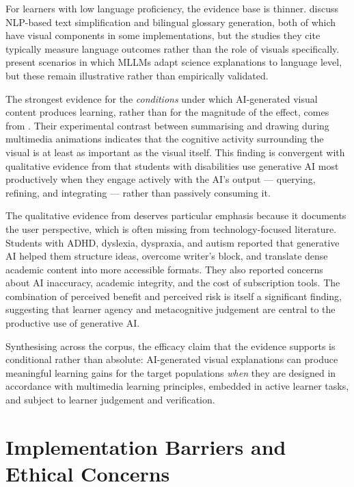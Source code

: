 For learners with low language proficiency, the evidence base is thinner. \citet{ahmad2025} discuss NLP-based text simplification and bilingual glossary generation, both of which have visual components in some implementations, but the studies they cite typically measure language outcomes rather than the role of visuals specifically. \citet{bewersdorff2024} present scenarios in which MLLMs adapt science explanations to language level, but these remain illustrative rather than empirically validated.

The strongest evidence for the \emph{conditions} under which AI-generated visual content produces learning, rather than for the magnitude of the effect, comes from \citet{lawson2024}. Their experimental contrast between summarising and drawing during multimedia animations indicates that the cognitive activity surrounding the visual is at least as important as the visual itself. This finding is convergent with qualitative evidence from \citet{buhler2024} that students with disabilities use generative AI most productively when they engage actively with the AI's output --- querying, refining, and integrating --- rather than passively consuming it.

The qualitative evidence from \citet{buhler2024} deserves particular emphasis because it documents the user perspective, which is often missing from technology-focused literature. Students with ADHD, dyslexia, dyspraxia, and autism reported that generative AI helped them structure ideas, overcome writer's block, and translate dense academic content into more accessible formats. They also reported concerns about AI inaccuracy, academic integrity, and the cost of subscription tools. The combination of perceived benefit and perceived risk is itself a significant finding, suggesting that learner agency and metacognitive judgement are central to the productive use of generative AI.

Synthesising across the corpus, the efficacy claim that the evidence supports is conditional rather than absolute: AI-generated visual explanations can produce meaningful learning gains for the target populations \emph{when} they are designed in accordance with multimedia learning principles, embedded in active learner tasks, and subject to learner judgement and verification.

\section{Implementation Barriers and Ethical Concerns}


